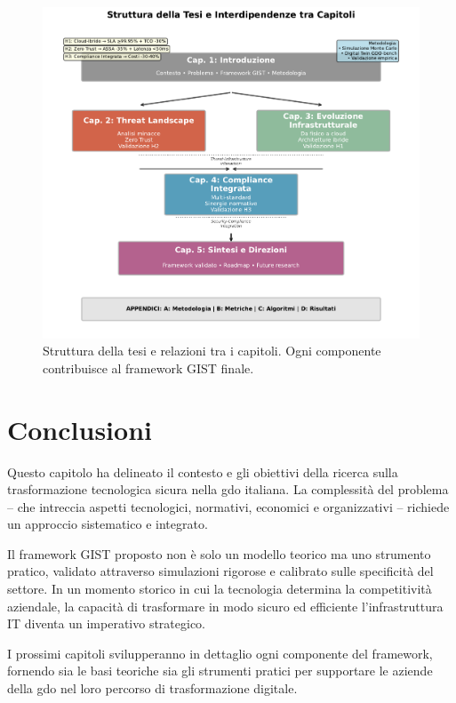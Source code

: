 \begin{figure}[htbp]
\centering
\includegraphics[width=\textwidth]{thesis_figures/cap1/fig_1_4_thesis_structure.pdf}
\caption{Struttura della tesi e relazioni tra i capitoli. Ogni componente contribuisce al framework GIST finale.}
\label{fig:thesis_structure}
\end{figure}

\section{Conclusioni}
\label{sec:conclusioni_cap1}

Questo capitolo ha delineato il contesto e gli obiettivi della ricerca sulla trasformazione tecnologica sicura nella \gls{gdo} italiana. La complessità del problema – che intreccia aspetti tecnologici, normativi, economici e organizzativi – richiede un approccio sistematico e integrato.

Il framework GIST proposto non è solo un modello teorico ma uno strumento pratico, validato attraverso simulazioni rigorose e calibrato sulle specificità del settore. In un momento storico in cui la tecnologia determina la competitività aziendale, la capacità di trasformare in modo sicuro ed efficiente l'infrastruttura IT diventa un imperativo strategico.

I prossimi capitoli svilupperanno in dettaglio ogni componente del framework, fornendo sia le basi teoriche sia gli strumenti pratici per supportare le aziende della \gls{gdo} nel loro percorso di trasformazione digitale.

\clearpage
\printbibliography[
    heading=subbibliography,
    title={Riferimenti bibliografici del capitolo},
]

